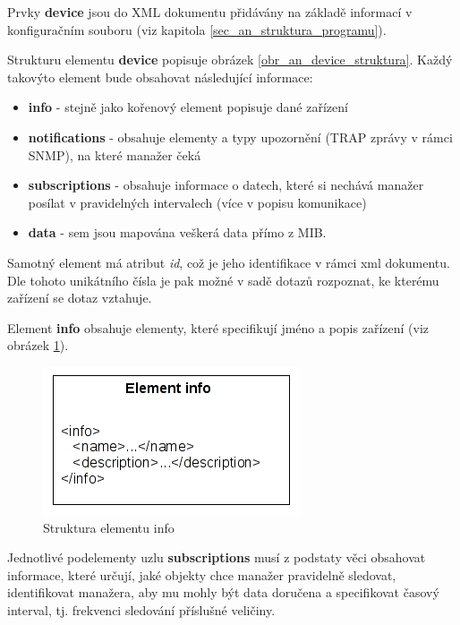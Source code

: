 Prvky \textbf{device} jsou do XML dokumentu přidávány na základě informací v konfiguračním souboru (viz kapitola \ref{sec_an_struktura_programu}).

Strukturu elementu \textbf{device} popisuje obrázek \ref{obr_an_device_struktura}. Každý takovýto element bude obsahovat následující informace:
\begin{itemize}
	\item \textbf{info} - stejně jako kořenový element popisuje dané zařízení
	\item \textbf{notifications} - obsahuje elementy a typy upozornění (TRAP zprávy v rámci SNMP), na které manažer čeká
	\item \textbf{subscriptions} - obsahuje informace o datech, které si nechává manažer posílat v pravidelných intervalech (více v popisu komunikace)
	\item \textbf{data} - sem jsou mapována veškerá data přímo z MIB.
\end{itemize}

Samotný element má atribut \textit{id}, což je jeho identifikace v rámci xml dokumentu. Dle tohoto unikátního čísla je pak možné
v sadě dotazů rozpoznat, ke kterému zařízení se dotaz vztahuje.


Element \textbf{info} obsahuje elementy, které specifikují jméno a popis zařízení (viz obrázek \ref{obr_an_info_element}).

\begin{figure}[htp]
	\begin{center}
		\includegraphics{obrazky/04_element_info.png}
		\caption{Struktura elementu info}
		\label{obr_an_info_element}
	\end{center}
\end{figure}

Jednotlivé podelementy uzlu \textbf{subscriptions} musí z podstaty věci obsahovat informace, které určují, jaké objekty chce manažer pravidelně sledovat, identifikovat
manažera, aby mu mohly být data doručena a specifikovat časový interval, tj. frekvenci sledování příslušné veličiny.

